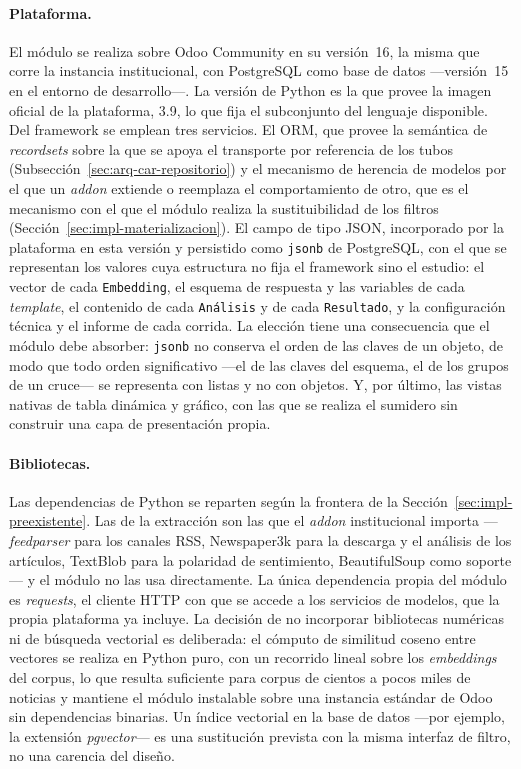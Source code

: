 \documentclass[12pt]{report}
\begin{document}
\paragraph{Plataforma.} El módulo se realiza sobre Odoo Community en su versión~16, la misma que corre la instancia institucional, con PostgreSQL como base de datos ---versión~15 en el entorno de desarrollo---. La versión de Python es la que provee la imagen oficial de la plataforma, 3.9, lo que fija el subconjunto del lenguaje disponible. Del framework se emplean tres servicios. El ORM, que provee la semántica de \textit{recordsets} sobre la que se apoya el transporte por referencia de los tubos (Subsección~\ref{sec:arq-car-repositorio}) y el mecanismo de herencia de modelos por el que un \textit{addon} extiende o reemplaza el comportamiento de otro, que es el mecanismo con el que el módulo realiza la sustituibilidad de los filtros (Sección~\ref{sec:impl-materializacion}). El campo de tipo JSON, incorporado por la plataforma en esta versión y persistido como \texttt{jsonb} de PostgreSQL, con el que se representan los valores cuya estructura no fija el framework sino el estudio: el vector de cada \texttt{Embedding}, el esquema de respuesta y las variables de cada \textit{template}, el contenido de cada \texttt{Análisis} y de cada \texttt{Resultado}, y la configuración técnica y el informe de cada corrida. La elección tiene una consecuencia que el módulo debe absorber: \texttt{jsonb} no conserva el orden de las claves de un objeto, de modo que todo orden significativo ---el de las claves del esquema, el de los grupos de un cruce--- se representa con listas y no con objetos. Y, por último, las vistas nativas de tabla dinámica y gráfico, con las que se realiza el sumidero sin construir una capa de presentación propia.

\paragraph{Bibliotecas.} Las dependencias de Python se reparten según la frontera de la Sección~\ref{sec:impl-preexistente}. Las de la extracción son las que el \textit{addon} institucional importa ---\textit{feedparser} para los canales RSS, Newspaper3k para la descarga y el análisis de los artículos, TextBlob para la polaridad de sentimiento, BeautifulSoup como soporte--- y el módulo no las usa directamente. La única dependencia propia del módulo es \textit{requests}, el cliente HTTP con que se accede a los servicios de modelos, que la propia plataforma ya incluye. La decisión de no incorporar bibliotecas numéricas ni de búsqueda vectorial es deliberada: el cómputo de similitud coseno entre vectores se realiza en Python puro, con un recorrido lineal sobre los \textit{embeddings} del corpus, lo que resulta suficiente para corpus de cientos a pocos miles de noticias y mantiene el módulo instalable sobre una instancia estándar de Odoo sin dependencias binarias. Un índice vectorial en la base de datos ---por ejemplo, la extensión \textit{pgvector}--- es una sustitución prevista con la misma interfaz de filtro, no una carencia del diseño.
\end{document}
